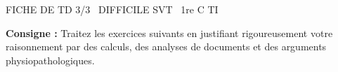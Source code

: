 \documentclass[11pt]{article}
\begin{document}
\begin{tcolorbox}[enhanced,colback=popink,colframe=popink,arc=10pt,boxrule=0pt,left=12pt,right=12pt,top=9pt,bottom=9pt]
{\color{white}\popxbold\small FICHE DE TD 3/3 \textbullet\ DIFFICILE \hfill SVT \textbullet\ 1re C TI\par}
\end{tcolorbox}
\vspace{4pt}
\noindent \textbf{Consigne :} Traitez les exercices suivants en justifiant rigoureusement votre raisonnement par des calculs, des analyses de documents et des arguments physiopathologiques.
\end{document}
